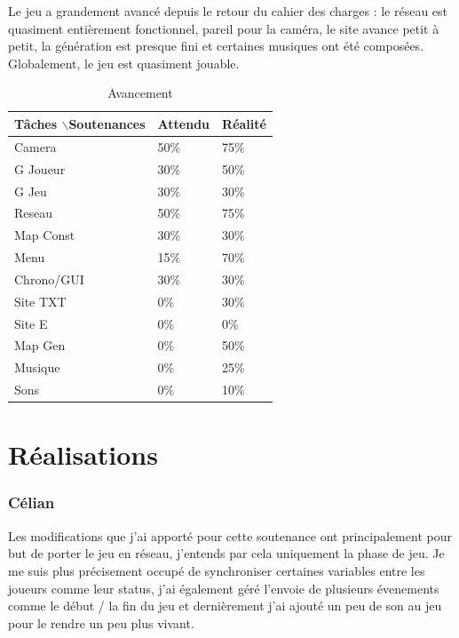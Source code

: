\documentclass{article}
\begin{document}
Le jeu a grandement avancé depuis le retour du cahier des charges : le réseau est quasiment entièrement fonctionnel, pareil pour la caméra, le site avance petit à petit, la génération est presque fini et certaines musiques ont été composées. Globalement, le jeu est quasiment jouable.
\begin{table}[!h]
\centering
\caption{Avancement}
\begin{tabular}{|l|l|l|}

\hline
Tâches $\backslash$Soutenances & Attendu & Réalité \\ \hline
Camera & 50\% & 75\% \\ \hline
G Joueur & 30\% & 50\% \\ \hline
G Jeu & 30\% & 30\% \\ \hline
Reseau & 50\% & 75\% \\ \hline
Map Const & 30\% & 30\% \\ \hline
Menu & 15\% & 70\% \\ \hline
Chrono/GUI & 30\% & 30\% \\ \hline
Site TXT & 0\% & 30\% \\ \hline
Site E & 0\% & 0\% \\ \hline
Map Gen & 0\% & 50\% \\ \hline
Musique & 0\% & 25\% \\ \hline
Sons & 0\% & 10\% \\ \hline

\end{tabular}
\end{table}
 
\newpage
\section{Réalisations}



\newpage
\subsubsection{Célian}

Les modifications que j'ai apporté pour cette soutenance ont principalement pour but de porter le jeu en réseau, j'entends par cela uniquement la phase de jeu. Je me suis plus précisement occupé de synchroniser certaines variables entre les joueurs comme leur status, j'ai également géré l'envoie de plusieurs évenements comme le début / la fin du jeu et dernièrement j'ai ajouté un peu de son au jeu pour le rendre un peu plus vivant.
\end{document}
